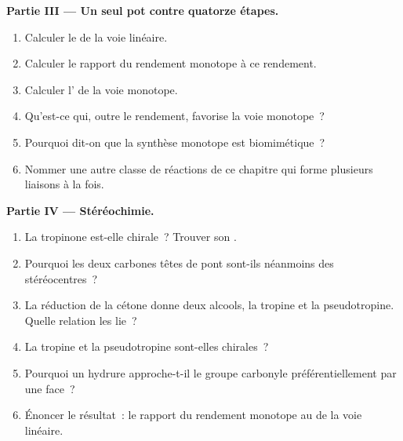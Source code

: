 \begin{problem}
\medskip\noindent\textbf{Partie III --- Un seul pot contre quatorze étapes.}
\begin{enumerate}[resume]
  \item Calculer le  de la voie linéaire.
  \item Calculer le rapport du rendement monotope à ce rendement.
  \item Calculer l' de la voie monotope.
  \item Qu'est-ce qui, outre le rendement, favorise la voie monotope~?
  \item Pourquoi dit-on que la synthèse monotope est biomimétique~?
  \item Nommer une autre classe de réactions de ce chapitre qui forme
        plusieurs liaisons à la fois.
\end{enumerate}

\medskip\noindent\textbf{Partie IV --- Stéréochimie.}
\begin{enumerate}[resume]
  \item La tropinone est-elle chirale~? Trouver son .
  \item Pourquoi les deux carbones têtes de pont sont-ils néanmoins des
        stéréocentres~?
  \item La réduction de la cétone donne deux alcools, la tropine et la
        pseudotropine. Quelle relation les lie~?
  \item La tropine et la pseudotropine sont-elles chirales~?
  \item Pourquoi un hydrure approche-t-il le groupe carbonyle
        préférentiellement par une face~?
  \item Énoncer le résultat~: le rapport du rendement monotope au  de la voie linéaire.
\end{enumerate}
\end{problem}
